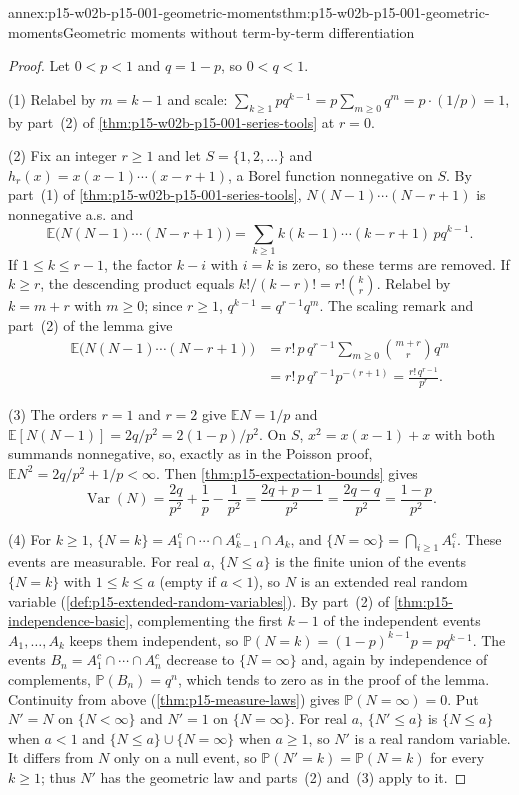 \begin{annexitem}{annex:p15-w02b-p15-001-geometric-moments}{thm:p15-w02b-p15-001-geometric-moments}{Geometric moments without term-by-term differentiation}
\begin{proof}
Let \(0<p<1\) and \(q=1-p\), so \(0<q<1\).

(1) Relabel by \(m=k-1\) and scale:
\(\sum_{k\geq1}pq^{k-1}=p\sum_{m\geq0}q^m=p\cdot(1/p)=1\), by
part~(2) of \cref{thm:p15-w02b-p15-001-series-tools} at \(r=0\).

(2) Fix an integer \(r\geq1\) and let \(S=\{1,2,\ldots\}\) and
\(h_r(x)=x(x-1)\cdots(x-r+1)\), a Borel function nonnegative on
\(S\). By part~(1) of \cref{thm:p15-w02b-p15-001-series-tools},
\(N(N-1)\cdots(N-r+1)\) is nonnegative a.s. and
\[
 \mathbb E\bigl(N(N-1)\cdots(N-r+1)\bigr)
  =\sum_{k\geq1}k(k-1)\cdots(k-r+1)\,pq^{k-1}.
\]
If \(1\leq k\leq r-1\), the factor \(k-i\) with \(i=k\) is zero, so
these terms are removed. If \(k\geq r\), the descending product equals
\(k!/(k-r)!=r!\binom kr\). Relabel by \(k=m+r\) with \(m\geq0\); since
\(r\geq1\), \(q^{k-1}=q^{r-1}q^m\). The scaling remark and part~(2) of
the lemma give
\[
 \begin{aligned}
 \mathbb E\bigl(N(N-1)\cdots(N-r+1)\bigr)
 &=r!\,p\,q^{r-1}\sum_{m\geq0}\binom{m+r}{r}q^m\\
 &=r!\,p\,q^{r-1}p^{-(r+1)}=\frac{r!\,q^{r-1}}{p^r}.
 \end{aligned}
\]

(3) The orders \(r=1\) and \(r=2\) give \(\mathbb EN=1/p\) and
\(\mathbb E[N(N-1)]=2q/p^2=2(1-p)/p^2\). On \(S\),
\(x^2=x(x-1)+x\) with both summands nonnegative, so, exactly as in the
Poisson proof, \(\mathbb EN^2=2q/p^2+1/p<\infty\). Then
\cref{thm:p15-expectation-bounds} gives
\[
 \operatorname{Var}(N)=\frac{2q}{p^2}+\frac1p-\frac1{p^2}
 =\frac{2q+p-1}{p^2}=\frac{2q-q}{p^2}=\frac{1-p}{p^2}.
\]

(4) For \(k\geq1\),
\(\{N=k\}=A_1^c\cap\cdots\cap A_{k-1}^c\cap A_k\), and
\(\{N=\infty\}=\bigcap_{i\geq1}A_i^c\). These events are measurable.
For real \(a\), \(\{N\leq a\}\) is the finite union of the events
\(\{N=k\}\) with \(1\leq k\leq a\) (empty if \(a<1\)), so \(N\) is an
extended real random variable (\cref{def:p15-extended-random-variables}).
By part~(2) of \cref{thm:p15-independence-basic}, complementing the
first \(k-1\) of the independent events \(A_1,\ldots,A_k\) keeps them
independent, so
\(\mathbb P(N=k)=(1-p)^{k-1}p=pq^{k-1}\). The events
\(B_n=A_1^c\cap\cdots\cap A_n^c\) decrease to \(\{N=\infty\}\) and,
again by independence of complements, \(\mathbb P(B_n)=q^n\), which
tends to zero as in the proof of the lemma. Continuity from above
(\cref{thm:p15-measure-laws}) gives \(\mathbb P(N=\infty)=0\).
Put \(N'=N\) on \(\{N<\infty\}\) and \(N'=1\) on \(\{N=\infty\}\).
For real \(a\), \(\{N'\leq a\}\) is \(\{N\leq a\}\) when \(a<1\) and
\(\{N\leq a\}\cup\{N=\infty\}\) when \(a\geq1\), so \(N'\) is a
real random variable. It differs from \(N\) only on a null event, so
\(\mathbb P(N'=k)=\mathbb P(N=k)\) for every \(k\geq1\); thus \(N'\)
has the geometric law and parts~(2) and~(3) apply to it.


\end{proof}
\end{annexitem}
